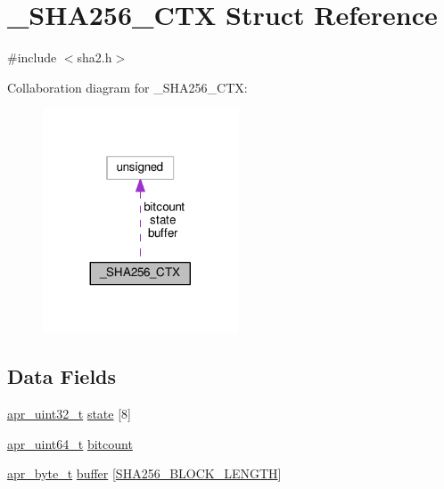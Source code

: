 \hypertarget{struct__SHA256__CTX}{}\section{\+\_\+\+S\+H\+A256\+\_\+\+C\+TX Struct Reference}
\label{struct__SHA256__CTX}


{\ttfamily \#include $<$sha2.\+h$>$}



Collaboration diagram for \+\_\+\+S\+H\+A256\+\_\+\+C\+TX\+:
\nopagebreak
\begin{figure}[H]
\begin{center}
\leavevmode
\includegraphics[width=164pt]{struct__SHA256__CTX__coll__graph}
\end{center}
\end{figure}
\subsection*{Data Fields}
\begin{DoxyCompactItemize}
\item 
\hyperlink{group__apr__platform_ga558548a135d8a816c4787250744ea147}{apr\+\_\+uint32\+\_\+t} \hyperlink{struct__SHA256__CTX_a651ee21c1ee494e3a6f755f1586acba7}{state} \mbox{[}8\mbox{]}
\item 
\hyperlink{group__apr__platform_ga722b277a42230f3fd41cb5be7a76cfb4}{apr\+\_\+uint64\+\_\+t} \hyperlink{struct__SHA256__CTX_ad7f82a082163b345b5ac7a0f9478e5a6}{bitcount}
\item 
\hyperlink{group__apr__platform_gadcfa334915b4605a0052cb4ca542eb3a}{apr\+\_\+byte\+\_\+t} \hyperlink{struct__SHA256__CTX_a64c78dd109eb135023e28c3b17ea0c59}{buffer} \mbox{[}\hyperlink{sha2_8h_af7a1879c2d7cd5cf31c91c0eb91b0015}{S\+H\+A256\+\_\+\+B\+L\+O\+C\+K\+\_\+\+L\+E\+N\+G\+TH}\mbox{]}
\end{DoxyCompactItemize}


